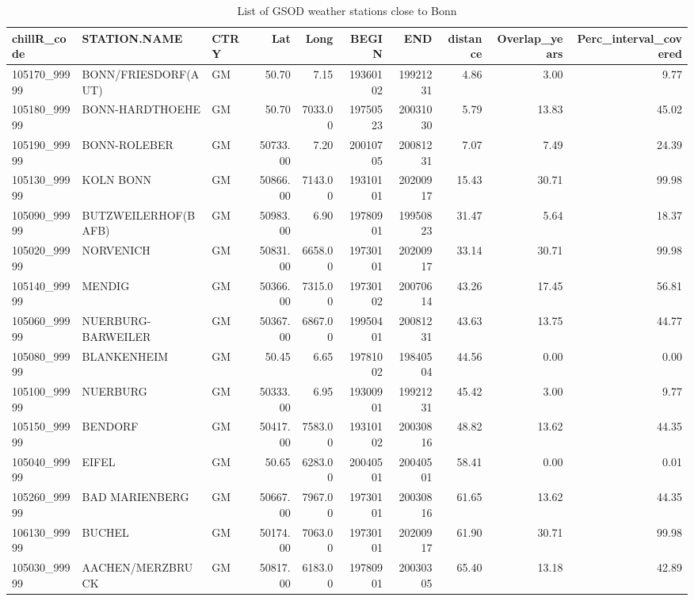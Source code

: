 \documentclass[
]{book}
\begin{document}
\begin{table}

\caption{\label{tab:unnamed-chunk-10}List of GSOD weather stations close to Bonn}
\fontsize{10}{12}\selectfont
\begin{tabular}[t]{l|l|l|r|r|r|r|r|r|r}
\hline
chillR\_code & STATION.NAME & CTRY & Lat & Long & BEGIN & END & distance & Overlap\_years & Perc\_interval\_covered\\
\hline
105170\_99999 & BONN/FRIESDORF(AUT) & GM & 50.70 & 7.15 & 19360102 & 19921231 & 4.86 & 3.00 & 9.77\\
\hline
105180\_99999 & BONN-HARDTHOEHE & GM & 50.70 & 7033.00 & 19750523 & 20031030 & 5.79 & 13.83 & 45.02\\
\hline
105190\_99999 & BONN-ROLEBER & GM & 50733.00 & 7.20 & 20010705 & 20081231 & 7.07 & 7.49 & 24.39\\
\hline
105130\_99999 & KOLN BONN & GM & 50866.00 & 7143.00 & 19310101 & 20200917 & 15.43 & 30.71 & 99.98\\
\hline
105090\_99999 & BUTZWEILERHOF(BAFB) & GM & 50983.00 & 6.90 & 19780901 & 19950823 & 31.47 & 5.64 & 18.37\\
\hline
105020\_99999 & NORVENICH & GM & 50831.00 & 6658.00 & 19730101 & 20200917 & 33.14 & 30.71 & 99.98\\
\hline
105140\_99999 & MENDIG & GM & 50366.00 & 7315.00 & 19730102 & 20070614 & 43.26 & 17.45 & 56.81\\
\hline
105060\_99999 & NUERBURG-BARWEILER & GM & 50367.00 & 6867.00 & 19950401 & 20081231 & 43.63 & 13.75 & 44.77\\
\hline
105080\_99999 & BLANKENHEIM & GM & 50.45 & 6.65 & 19781002 & 19840504 & 44.56 & 0.00 & 0.00\\
\hline
105100\_99999 & NUERBURG & GM & 50333.00 & 6.95 & 19300901 & 19921231 & 45.42 & 3.00 & 9.77\\
\hline
105150\_99999 & BENDORF & GM & 50417.00 & 7583.00 & 19310102 & 20030816 & 48.82 & 13.62 & 44.35\\
\hline
105040\_99999 & EIFEL & GM & 50.65 & 6283.00 & 20040501 & 20040501 & 58.41 & 0.00 & 0.01\\
\hline
105260\_99999 & BAD MARIENBERG & GM & 50667.00 & 7967.00 & 19730101 & 20030816 & 61.65 & 13.62 & 44.35\\
\hline
106130\_99999 & BUCHEL & GM & 50174.00 & 7063.00 & 19730101 & 20200917 & 61.90 & 30.71 & 99.98\\
\hline
105030\_99999 & AACHEN/MERZBRUCK & GM & 50817.00 & 6183.00 & 19780901 & 20030305 & 65.40 & 13.18 & 42.89\\

\end{tabular}
\end{table}
\end{document}
